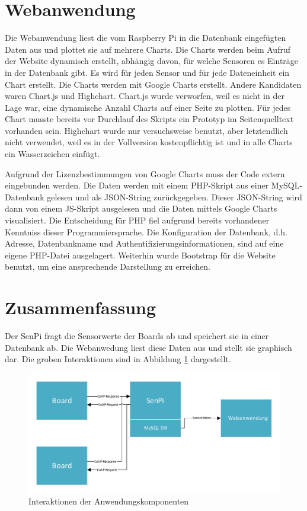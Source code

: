 \documentclass[a4paper]{article}
\begin{document}
\section{Webanwendung}
Die Webanwendung liest die vom Raspberry Pi in die Datenbank eingefügten Daten aus und plottet sie auf mehrere Charts. Die Charts werden beim Aufruf der Website dynamisch erstellt, abhängig davon, für welche Sensoren es Einträge in der Datenbank gibt. Es wird für jeden Sensor und für jede Dateneinheit ein Chart erstellt. Die Charts werden mit Google Charts erstellt. Andere Kandidaten waren Chart.js und Highchart. Chart.js wurde verworfen, weil es nicht in der Lage war, eine dynamische Anzahl Charts auf einer Seite zu plotten. Für jedes Chart musste bereits vor Durchlauf des Skripts ein Prototyp im Seitenquelltext vorhanden sein. Highchart wurde nur versuchsweise benutzt, aber letztendlich nicht verwendet, weil es in der Vollversion kostenpflichtig ist und in alle Charts ein Wasserzeichen einfügt.

Aufgrund der Lizenzbestimmungen von Google Charts muss der Code extern eingebunden werden. Die Daten werden mit einem PHP-Skript aus einer MySQL-Datenbank gelesen und als JSON-String zurückgegeben. Dieser JSON-String wird dann von einem JS-Skript ausgelesen und die Daten mittels Google Charts visualisiert. Die Entscheidung für PHP fiel aufgrund bereits vorhandener Kenntniss dieser Programmiersprache. Die Konfiguration der Datenbank, d.h. Adresse, Datenbankname und Authentifizierungsinformationen, sind auf eine eigene PHP-Datei ausgelagert. Weiterhin wurde Bootstrap für die Website benutzt, um eine ansprechende Darstellung zu erreichen.

\section{Zusammenfassung}
Der SenPi fragt die Sensorwerte der Boards ab und speichert sie in einer Datenbank ab. Die Webanwedung liest diese Daten aus und stellt sie graphisch dar. Die groben Interaktionen sind in Abbildung \ref{fig:interacion} dargestellt.
\begin{figure}[h]
\centering
\includegraphics[scale=0.7]{interactionDiagram.pdf}
\caption{\label{fig:interacion}Interaktionen der Anwendungskomponenten}
\end{figure}
\end{document}
